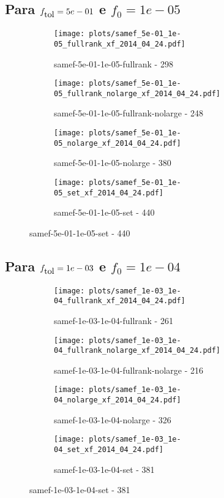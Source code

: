 \newpage
\subsection{Para $f_{\mbox{tol}} = 5e-01$ e $f_0 = 1e-05$}

\begin{figure}[H]
  \centering
  \begin{subfigure}{0.48\textwidth}
    \texttt{[image: plots/samef\_5e-01\_1e-05\_fullrank\_xf\_2014\_04\_24.pdf]}
    \caption{samef-5e-01-1e-05-fullrank - 298}
  \end{subfigure}
  \begin{subfigure}{0.48\textwidth}
    \texttt{[image: plots/samef\_5e-01\_1e-05\_fullrank\_nolarge\_xf\_2014\_04\_24.pdf]}
    \caption{samef-5e-01-1e-05-fullrank-nolarge - 248}
  \end{subfigure}
  \begin{subfigure}{0.48\textwidth}
    \texttt{[image: plots/samef\_5e-01\_1e-05\_nolarge\_xf\_2014\_04\_24.pdf]}
    \caption{samef-5e-01-1e-05-nolarge - 380}
  \end{subfigure}
  \begin{subfigure}{0.48\textwidth}
    \texttt{[image: plots/samef\_5e-01\_1e-05\_set\_xf\_2014\_04\_24.pdf]}
    \caption{samef-5e-01-1e-05-set - 440}
  \end{subfigure}
\end{figure}

\newpage
\subsection{Para $f_{\mbox{tol}} = 1e-03$ e $f_0 = 1e-04$}

\begin{figure}[H]
  \centering
  \begin{subfigure}{0.48\textwidth}
    \texttt{[image: plots/samef\_1e-03\_1e-04\_fullrank\_xf\_2014\_04\_24.pdf]}
    \caption{samef-1e-03-1e-04-fullrank - 261}
  \end{subfigure}
  \begin{subfigure}{0.48\textwidth}
    \texttt{[image: plots/samef\_1e-03\_1e-04\_fullrank\_nolarge\_xf\_2014\_04\_24.pdf]}
    \caption{samef-1e-03-1e-04-fullrank-nolarge - 216}
  \end{subfigure}
  \begin{subfigure}{0.48\textwidth}
    \texttt{[image: plots/samef\_1e-03\_1e-04\_nolarge\_xf\_2014\_04\_24.pdf]}
    \caption{samef-1e-03-1e-04-nolarge - 326}
  \end{subfigure}
  \begin{subfigure}{0.48\textwidth}
    \texttt{[image: plots/samef\_1e-03\_1e-04\_set\_xf\_2014\_04\_24.pdf]}
    \caption{samef-1e-03-1e-04-set - 381}
  \end{subfigure}
\end{figure}

